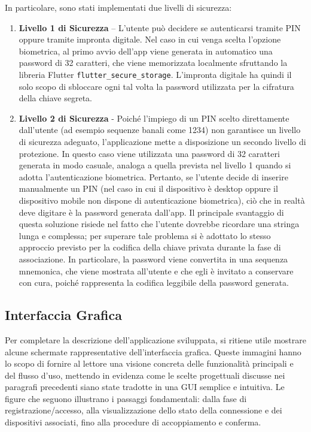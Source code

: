 In particolare, sono stati implementati due livelli di sicurezza:

\begin{enumerate}[label={}]
    \item \textbf{Livello 1 di Sicurezza} – L'utente può decidere se autenticarsi tramite PIN oppure tramite impronta digitale. Nel caso in cui venga scelta l'opzione biometrica, al primo avvio dell'app viene generata in automatico una password di 32 caratteri, che viene memorizzata localmente sfruttando la libreria Flutter \texttt{flutter\_secure\_storage}. L'impronta digitale ha quindi il solo scopo di sbloccare ogni tal volta la password utilizzata per la cifratura della chiave segreta.
    \item \textbf{Livello 2 di Sicurezza} - Poiché l'impiego di un PIN scelto direttamente dall'utente (ad esempio sequenze banali come 1234) non garantisce un livello di sicurezza adeguato, l'applicazione mette a disposizione un secondo livello di protezione. In questo caso viene utilizzata una password di 32 caratteri generata in modo casuale, analoga a quella prevista nel livello 1 quando si adotta l'autenticazione biometrica. Pertanto, se l'utente decide di inserire manualmente un PIN (nel caso in cui il dispositivo è desktop oppure il dispositivo mobile non dispone di autenticazione biometrica), ciò che in realtà deve digitare è la password generata dall'app. Il principale svantaggio di questa soluzione risiede nel fatto che l'utente dovrebbe ricordare una stringa lunga e complessa; per superare tale problema si è adottato lo stesso approccio previsto per la codifica della chiave privata durante la fase di associazione. In particolare, la password viene convertita in una sequenza mnemonica, che viene mostrata all'utente e che egli è invitato a conservare con cura, poiché rappresenta la codifica leggibile della password generata.

\end{enumerate}

\subsection{Interfaccia Grafica}

Per completare la descrizione dell'applicazione sviluppata, si ritiene utile mostrare alcune schermate rappresentative dell'interfaccia grafica. Queste immagini hanno lo scopo di fornire al lettore una visione concreta delle funzionalità principali e del flusso d'uso, mettendo in evidenza come le scelte progettuali discusse nei paragrafi precedenti siano state tradotte in una GUI semplice e intuitiva. Le figure che seguono illustrano i passaggi fondamentali: dalla fase di registrazione/accesso, alla visualizzazione dello stato della connessione e dei dispositivi associati, fino alla procedure di accoppiamento e conferma.


